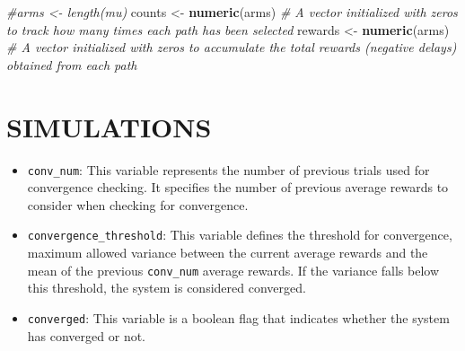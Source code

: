 \documentclass[
]{article}
\newenvironment{Shaded}{\begin{snugshade}}{\end{snugshade}}
\newcommand{\CommentTok}[1]{\textcolor[rgb]{0.56,0.35,0.01}{\textit{#1}}}
\newcommand{\FunctionTok}[1]{\textcolor[rgb]{0.13,0.29,0.53}{\textbf{#1}}}
\newcommand{\NormalTok}[1]{#1}
\newcommand{\OtherTok}[1]{\textcolor[rgb]{0.56,0.35,0.01}{#1}}
\begin{document}
\begin{Shaded}
\begin{Highlighting}[]
\CommentTok{\#arms \textless{}{-} length(mu)}
\NormalTok{counts }\OtherTok{\textless{}{-}} \FunctionTok{numeric}\NormalTok{(arms) }\CommentTok{\# A vector initialized with zeros to track how many times each path has been selected}
\NormalTok{rewards }\OtherTok{\textless{}{-}} \FunctionTok{numeric}\NormalTok{(arms) }\CommentTok{\# A vector initialized with zeros to accumulate the total rewards (negative delays) obtained from each path}
\end{Highlighting}
\end{Shaded}

\hypertarget{simulations}{%
\section{SIMULATIONS}\label{simulations}}

\begin{itemize}
\item
  \texttt{conv\_num}: This variable represents the number of previous
  trials used for convergence checking. It specifies the number of
  previous average rewards to consider when checking for convergence.
\item
  \texttt{convergence\_threshold}: This variable defines the threshold
  for convergence, maximum allowed variance between the current average
  rewards and the mean of the previous \texttt{conv\_num} average
  rewards. If the variance falls below this threshold, the system is
  considered converged.
\item
  \texttt{converged}: This variable is a boolean flag that indicates
  whether the system has converged or not.
\end{itemize}
\end{document}
